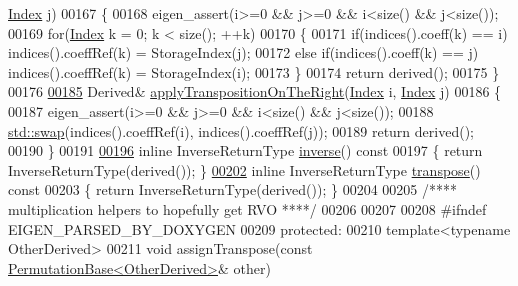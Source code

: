 \begin{DoxyCode}
      \hyperlink{group___core___module_a554f30542cc2316add4b1ea0a492ff02}{Index} j)
00167     \{
00168       eigen\_assert(i>=0 && j>=0 && i<size() && j<size());
00169       \textcolor{keywordflow}{for}(\hyperlink{group___core___module_a554f30542cc2316add4b1ea0a492ff02}{Index} k = 0; k < size(); ++k)
00170       \{
00171         \textcolor{keywordflow}{if}(indices().coeff(k) == i) indices().coeffRef(k) = StorageIndex(j);
00172         \textcolor{keywordflow}{else} \textcolor{keywordflow}{if}(indices().coeff(k) == j) indices().coeffRef(k) = StorageIndex(i);
00173       \}
00174       \textcolor{keywordflow}{return} derived();
00175     \}
00176 
\hyperlink{group___core___module_a5f98da0712570d0c4b12f61839ae4193}{00185}     Derived& \hyperlink{group___core___module_a5f98da0712570d0c4b12f61839ae4193}{applyTranspositionOnTheRight}(\hyperlink{group___core___module_a554f30542cc2316add4b1ea0a492ff02}{Index} i, 
      \hyperlink{group___core___module_a554f30542cc2316add4b1ea0a492ff02}{Index} j)
00186     \{
00187       eigen\_assert(i>=0 && j>=0 && i<size() && j<size());
00188       \hyperlink{endian_8c_a3ca5ecd34b04d6a243c054ac3a57f68d}{std::swap}(indices().coeffRef(i), indices().coeffRef(j));
00189       \textcolor{keywordflow}{return} derived();
00190     \}
00191 
\hyperlink{group___core___module_adb9af427f317202366c2832876064eb3}{00196}     \textcolor{keyword}{inline} InverseReturnType \hyperlink{group___core___module_adb9af427f317202366c2832876064eb3}{inverse}()\textcolor{keyword}{ const}
00197 \textcolor{keyword}{    }\{ \textcolor{keywordflow}{return} InverseReturnType(derived()); \}
\hyperlink{group___core___module_a05805e9f4182eec3f6632e1c765b5ffe}{00202}     \textcolor{keyword}{inline} InverseReturnType \hyperlink{group___core___module_a05805e9f4182eec3f6632e1c765b5ffe}{transpose}()\textcolor{keyword}{ const}
00203 \textcolor{keyword}{    }\{ \textcolor{keywordflow}{return} InverseReturnType(derived()); \}
00204 
00205     \textcolor{comment}{/**** multiplication helpers to hopefully get RVO ****/}
00206 
00207   
00208 \textcolor{preprocessor}{#ifndef EIGEN\_PARSED\_BY\_DOXYGEN}
00209   \textcolor{keyword}{protected}:
00210     \textcolor{keyword}{template}<\textcolor{keyword}{typename} OtherDerived>
00211     \textcolor{keywordtype}{void} assignTranspose(\textcolor{keyword}{const} \hyperlink{group___core___module_class_eigen_1_1_permutation_base}{PermutationBase<OtherDerived>}& other)

\end{DoxyCode}
